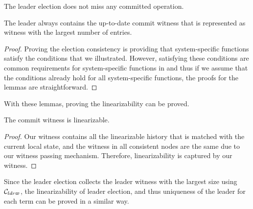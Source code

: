 \begin{lemma}\label{lemma:election-consistency}
The leader election does not miss any committed operation.
\end{lemma}
\vspace{-0.2em}

\begin{lemma} 
The leader always contains the up-to-date commit witness that is represented as
witness with the largest number of entries.
\end{lemma}
\vspace{-0.2em}

\begin{proof}
Proving the election consistency is providing that system-specific functions 
satisfy the conditions that we illustrated. However, satisfying these
conditions are common requirements for system-specific functions in
\sysname{} and thus if we assume that the conditions already hold for all
system-specific functions, the proofs for the lemmas are straightforward.
\end{proof}
\vspace{-0.2em}

With these lemmas, proving the linearizability can be proved.

\begin{theorem}[linearizability]\label{thm:linear-spec}
The commit witness is linearizable.
\end{theorem}
\vspace{-0.2em}

\begin{proof}
Our witness contains all the linearizable history that is matched with the current local state, 
and the witness in all consistent nodes are the same due to our witness passing mechanism. 
Therefore, linearizability is captured by our witness.
\end{proof}
\vspace{-0.2em}

Since the leader election collects the leader witness with the largest
size using $\mathcal{C}_{ldr\varpi}$, the linearizability of leader election, and thus uniqueness of the leader
for each term can be proved in a similar way. 
